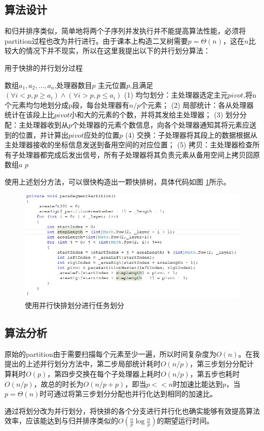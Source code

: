 \documentclass[UTF8]{article}
\begin{document}
\subsection{算法设计}
和归并排序类似，简单地将两个子序列并发执行并不能提高算法性能，必须将partition过程也改为并行进行。由于课本上构造二叉树需要$p=\Theta(n)$，这在$n$比较大的情况下并不现实，所以在这里我提出以下的并行划分算法：\\
\begin{algorithm}
	\caption{用于快排的并行划分过程}	
	\begin{algorithmic}[1]
		\Require 数组$a_1,a_2,\ldots,a_n$,处理器数目$p$
		\Ensure 主元位置$p$,且满足$(\forall i<p,p\geq a_i)\wedge(\forall i>p,p\leq a_i)$  
		\State (1) 均匀划分：主处理器选定主元$pivot$,将n个元素均匀地划分成p段，每台处理器有$n/p$个元素；
		\State (2) 局部统计：各从处理器统计在该段上比$pivot$小和大的元素的个数，并将其发给主处理器；
		\State (3) 划分分配：主处理器收到从$p$个处理器的元素个数信息，向各个处理器通知其将元素应送到的位置，并计算出$pivot$应处的位置$p$
		\State (4) 交换：子处理器将其段上的数据根据从主处理器接收的坐标信息发送到备用空间的对应位置；
		\State (5) 拷贝：主处理器检查所有子处理器都完成后发出信号，所有子处理器将其负责元素从备用空间上拷贝回原数组$a$
		\State \Return $p$
		\EndFunction
	\end{algorithmic}
\end{algorithm}
使用上述划分方法，可以很快构造出一颗快排树，具体代码如图 \ref{paraBSTBuild}所示。
\begin{figure}
	\includegraphics[width=1.0\textwidth]{parallelBstBuild.JPG}
	\caption{使用并行快排划分进行任务划分}
	\label{paraBSTBuild}
\end{figure} 
\subsection{算法分析}
原始的partition由于需要扫描每个元素至少一遍，所以时间复杂度为$O(n)$。在我提出的上述并行划分方法中，第二步局部统计耗时$O(n/p)$，第三步划分分配计算耗时$O(p)$，第四步交换在每个子处理器上耗时$O(n/p)$，第五步也耗时$O(n/p)$，故总的时长为$O(n/p+p)$，即当$p<<n$时加速比能达到$p$，当$p=\Theta(n)$时可通过将第三步划分分配也并行化达到相同的加速比。
\par 通过将划分改为并行划分，将快排的各个分支进行并行化也确实能够有效提高算法效率，应该能达到与归并排序类似的$O(\frac{n}{p}\log\frac{n}{p})$的期望运行时间。
\end{document}
